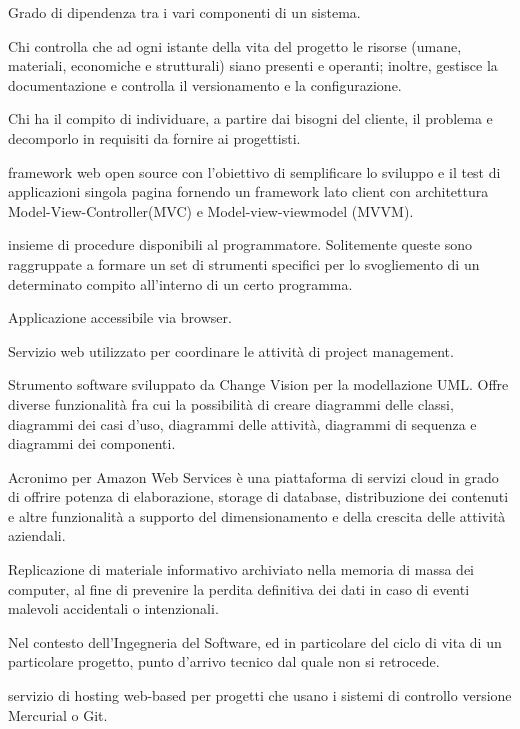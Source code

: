 \item[accoppiamento] Grado di dipendenza tra i vari componenti di un sistema.
\item[amministratore di progetto] Chi controlla che ad ogni istante della vita del progetto le risorse (umane, materiali, economiche e strutturali) siano presenti e operanti; inoltre, gestisce la documentazione e controlla il versionamento e la configurazione.
\item[analista] Chi ha il compito di individuare, a partire dai bisogni del cliente, il problema e decomporlo in requisiti da fornire ai progettisti.
\item[Angular.js]  framework web open source con l'obiettivo di semplificare lo sviluppo e il test di applicazioni singola pagina fornendo un framework lato client con architettura Model-View-Controller(MVC) e Model-view-viewmodel (MVVM).
\item[API] insieme di procedure disponibili al programmatore. Solitemente queste sono raggruppate a formare un set di strumenti specifici per lo svogliemento di un determinato compito all'interno di un certo programma.
\item[applicazione web] Applicazione accessibile via browser.
\item[Asana] Servizio web utilizzato per coordinare le attività di project management.
\item[Astah] Strumento software sviluppato da Change Vision per la modellazione UML. Offre diverse funzionalità fra cui la possibilità di creare diagrammi delle classi, diagrammi dei casi d’uso, diagrammi delle attività, diagrammi di sequenza e diagrammi dei componenti.
\item[AWS] Acronimo per Amazon Web Services è una piattaforma di servizi cloud in grado di offrire potenza di elaborazione, storage di database, distribuzione dei contenuti e altre funzionalità a supporto del dimensionamento e della crescita delle attività aziendali.
\item[backup] Replicazione di materiale informativo archiviato nella memoria di massa dei computer, al fine di prevenire la perdita definitiva dei dati in caso di eventi malevoli accidentali o intenzionali.
\item[baseline] Nel contesto dell'Ingegneria del Software, ed in particolare del ciclo di vita di un particolare progetto, punto d'arrivo tecnico dal quale non si retrocede.
\item[Bitbucket] servizio di hosting web-based per progetti che usano i sistemi di controllo versione Mercurial o Git.
